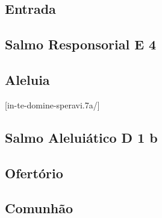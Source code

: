 
\subsection{Entrada}\label{subsection:tempus-per-annum/missa-3/introitus}

\AllowPageFlush

\subsection[Salmo Responsorial]{Salmo Responsorial \textmd{E 4}}\label{subsection:tempus-per-annum/missa-3/psalmus-responsorius}

\AllowPageFlush

\subsection{Aleluia}\label{subsection:tempus-per-annum/missa-3/alleluia}
[in-te-domine-speravi.7a/]

\AllowPageFlush

\subsection[Salmo Aleluiático]{Salmo Aleluiático \textmd{D 1 b}}\label{subsection:tempus-per-annum/missa-3/psalmus-alleluiaticus}

\AllowPageFlush

\subsection{Ofertório}\label{subsection:tempus-per-annum/missa-3/offertorium}

\AllowPageFlush

\subsection{Comunhão}\label{subsection:tempus-per-annum/missa-3/communio}
